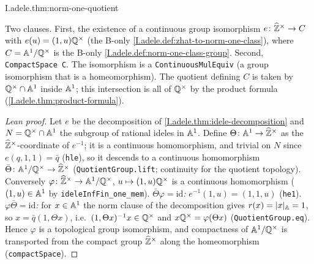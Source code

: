 \begin{theorem}
\end{theorem}
\begin{tfformal}{I.adele.thm:norm-one-quotient}
\begin{tffidelity}
Two clauses. First, the existence of a continuous group isomorphism $e\colon\widehat{\mathbb{Z}}^\times\to C$ with $e(u)=(1,u)\mathbb{Q}^\times$ (the B-only \cref{I.adele.def:zhat-to-norm-one-class}), where $C=\mathbb{A}^1/\mathbb{Q}^\times$ is the B-only \cref{I.adele.def:norm-one-class-group}. Second, \texttt{CompactSpace C}. The isomorphism is a \texttt{ContinuousMulEquiv} (a group isomorphism that is a homeomorphism). The quotient defining $C$ is taken by $\mathbb{Q}^\times\cap\mathbb{A}^1$ inside $\mathbb{A}^1$; this intersection is all of $\mathbb{Q}^\times$ by the product formula (\cref{I.adele.thm:product-formula}).
\end{tffidelity}
\end{tfformal}
\begin{proof}[Lean proof]
Let $e$ be the decomposition of \cref{I.adele.thm:idele-decomposition} and $N=\mathbb{Q}^\times\cap\mathbb{A}^1$ the subgroup of rational ideles in $\mathbb{A}^1$. Define $\Theta\colon\mathbb{A}^1\to\widehat{\mathbb{Z}}^\times$ as the $\widehat{\mathbb{Z}}^\times$-coordinate of $e^{-1}$; it is a continuous homomorphism, and trivial on $N$ since $e(q,1,1)=\bar q$ (\texttt{hle}), so it descends to a continuous homomorphism $\bar\Theta\colon\mathbb{A}^1/\mathbb{Q}^\times\to\widehat{\mathbb{Z}}^\times$ (\texttt{QuotientGroup.lift}; continuity for the quotient topology). Conversely $\varphi\colon\widehat{\mathbb{Z}}^\times\to\mathbb{A}^1/\mathbb{Q}^\times$, $u\mapsto(1,u)\mathbb{Q}^\times$ is a continuous homomorphism ($(1,u)\in\mathbb{A}^1$ by \texttt{ideleInfFin\_one\_mem}). \emph{$\bar\Theta\varphi=\mathrm{id}$:} $e^{-1}(1,u)=(1,1,u)$ (\texttt{he1}). \emph{$\varphi\bar\Theta=\mathrm{id}$:} for $x\in\mathbb{A}^1$ the norm clause of the decomposition gives $r(x)=\lvert x\rvert_{\mathbb{A}}=1$, so $x=\bar q(1,\Theta x)$, i.e.\ $(1,\Theta x)^{-1}x\in\mathbb{Q}^\times$ and $x\mathbb{Q}^\times=\varphi(\Theta x)$ (\texttt{QuotientGroup.eq}). Hence $\varphi$ is a topological group isomorphism, and compactness of $\mathbb{A}^1/\mathbb{Q}^\times$ is transported from the compact group $\widehat{\mathbb{Z}}^\times$ along the homeomorphism (\texttt{compactSpace}).
\end{proof}

